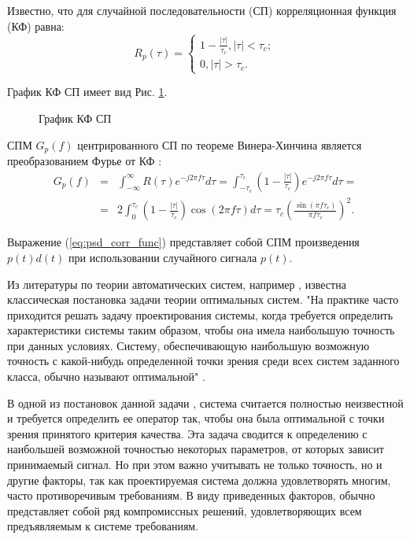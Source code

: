Известно, что для случайной последовательности (СП) корреляционная функция (КФ) равна:
\begin{equation}
	\label{eq:cdma_ca_corr_func}
	 R_p(\tau) = \begin{cases}
		1 - \frac{|\tau|}{\tau_c}, |\tau| < \tau_c; \\
		0, |\tau| > \tau_c.
		\end{cases}
\end{equation}

График КФ СП имеет вид Рис. \ref{pic:cf_code}.
\begin{figure}[h]
	\center{}
	\caption{График КФ СП} 
	\label{pic:cf_code}
\end{figure}

СПМ ${G_p(f)}$ центрированного СП по теореме Винера-Хинчина является преобразованием Фурье
от КФ \cite{borisovBook}:
\begin{align}
	\label{eq:psd_corr_func}
	G_p(f) & = & \int^{\infty}_{-\infty} R(\tau)e^{-j2\pi f \tau} d\tau = \int^{\tau_c}_{-\tau_c} \left( 1 - \frac{|\tau|}{\tau_c} \right) e^{-j2\pi f \tau} d\tau = \nonumber \\
		& = & 2\int^{\tau_c}_{0}\left( 1 - \frac{|\tau|}{\tau_c} \right) \cos{(2\pi f \tau)} d\tau = \tau_c \left( \frac{\sin{(\pi f \tau_c)}}{\pi f \tau_c} \right)^2.
\end{align}

Выражение (\ref{eq:psd_corr_func}) представляет собой СПМ произведения ${p(t)d(t)}$ при использовании случайного сигнала ${p(t)}$.

Из литературы по теории автоматических систем, например \cite{pugachev}, известна классическая постановка
задачи теории оптимальных систем. "На практике часто приходится решать задачу проектирования системы, когда
требуется определить характеристики системы таким образом, чтобы она имела наибольшую точность при данных условиях.
Систему, обеспечивающую наибольшую возможную точность с какой-нибудь определенной точки зрения среди всех систем
заданного класса, обычно называют оптимальной" \cite{pugachev}.

В одной из постановок данной задачи \cite{pugachev}, система считается полностью неизвестной
и требуется определить ее оператор так, чтобы она была оптимальной с точки зрения принятого критерия качества. Эта
задача сводится к определению с наибольшей возможной точностью некоторых параметров, от которых зависит принимаемый
сигнал. Но при этом важно учитывать не только точность, но и другие факторы, так как проектируемая система должна
удовлетворять многим, часто противоречивым требованиям. В виду приведенных факторов, обычно представляет собой
ряд компромиссных решений, удовлетворяющих всем предъявляемым к системе требованиям.

